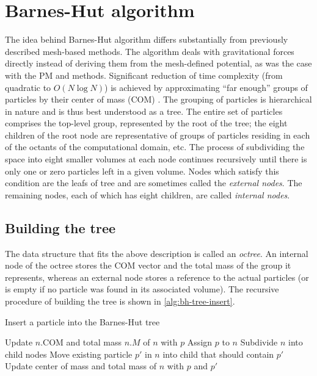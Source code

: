 \section{Barnes-Hut algorithm}
The idea behind Barnes-Hut algorithm differs substantially from previously described mesh-based methods.
The algorithm deals with gravitational forces directly instead of deriving them from the mesh-defined potential, as was the case with the PM and \PThreeM{} methods.
Significant reduction of time complexity (from quadratic to $O(N \log N)$) is achieved by approximating ``far enough'' groups of particles by their center of mass (COM) \cite{trenti2008gravitationalnbodysimulations}.
The grouping of particles is hierarchical in nature and is thus best understood as a tree.
The entire set of particles comprises the top-level group, represented by the root of the tree;
the eight children of the root node are representative of groups of particles residing in each of the octants of the computational domain, etc.
The process of subdividing the space into eight smaller volumes at each node continues recursively until there is only one or zero particles left in a given volume.
Nodes which satisfy this condition are the leafs of tree and are sometimes called the \textit{external nodes}.
The remaining nodes, each of which has eight children, are called \textit{internal nodes}.

\subsection{Building the tree}
The data structure that fits the above description is called an \textit{octree}.
An internal node of the octree stores the COM vector and the total mass of the group it represents, whereas an external node stores a reference to the actual particles (or is empty if no particle was found in its associated volume).
The recursive procedure of building the tree is shown in \autoref{alg:bh-tree-insert}.
\begin{algorithm}
    \caption{Insert a particle into the Barnes-Hut tree}\label{alg:bh-tree-insert}
    \begin{algorithmic}[1]
        \State Update $n.\textrm{COM}$ and total mass $n.M$ of $n$ with $p$
        \State {}
        \State Assign $p$ to $n$
        \Else {}
        \State Subdivide $n$ into child nodes
        \State Move existing particle $p'$ in $n$ into child that should contain $p'$
        \State Update center of mass and total mass of $n$ with $p$ and $p'$
        \State {}
        \EndIf
        \EndFunction
    \end{algorithmic}
\end{algorithm}


